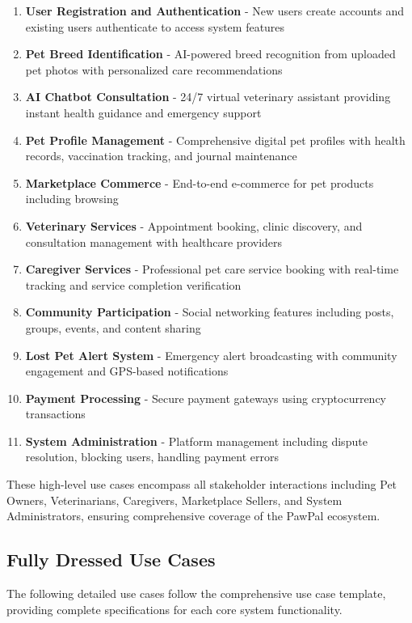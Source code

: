 \begin{enumerate}
    \item \textbf{User Registration and Authentication} - New users create accounts and existing users authenticate to access system features
    \item \textbf{Pet Breed Identification} - AI-powered breed recognition from uploaded pet photos with personalized care recommendations
    \item \textbf{AI Chatbot Consultation} - 24/7 virtual veterinary assistant providing instant health guidance and emergency support
    \item \textbf{Pet Profile Management} - Comprehensive digital pet profiles with health records, vaccination tracking, and journal maintenance
    \item \textbf{Marketplace Commerce} - End-to-end e-commerce for pet products including browsing
    \item \textbf{Veterinary Services} - Appointment booking, clinic discovery, and consultation management with healthcare providers
    \item \textbf{Caregiver Services} - Professional pet care service booking with real-time tracking and service completion verification
    \item \textbf{Community Participation} - Social networking features including posts, groups, events, and content sharing
    \item \textbf{Lost Pet Alert System} - Emergency alert broadcasting with community engagement and GPS-based notifications

    \item \textbf{Payment Processing} - Secure payment gateways using cryptocurrency transactions
    \item \textbf{System Administration} - Platform management including  dispute resolution, blocking users, handling payment errors 
\end{enumerate}

These high-level use cases encompass all stakeholder interactions including Pet Owners, Veterinarians, Caregivers, Marketplace Sellers, and System Administrators, ensuring comprehensive coverage of the PawPal ecosystem.

\subsection{Fully Dressed Use Cases}

The following detailed use cases follow the comprehensive use case template, providing complete specifications for each core system functionality.

